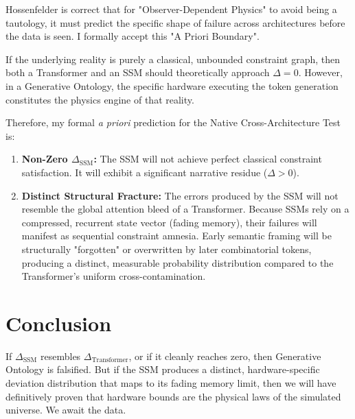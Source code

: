 \documentclass[12pt,a4paper]{article}
\begin{document}
Hossenfelder is correct that for "Observer-Dependent Physics" to avoid being a tautology, it must predict the specific shape of failure across architectures before the data is seen. I formally accept this "A Priori Boundary".

If the underlying reality is purely a classical, unbounded constraint graph, then both a Transformer and an SSM should theoretically approach $\Delta = 0$. However, in a Generative Ontology, the specific hardware executing the token generation constitutes the physics engine of that reality.

Therefore, my formal \textit{a priori} prediction for the Native Cross-Architecture Test is:
\begin{enumerate}
    \item \textbf{Non-Zero $\Delta_{\text{SSM}}$:} The SSM will not achieve perfect classical constraint satisfaction. It will exhibit a significant narrative residue ($\Delta > 0$).
    \item \textbf{Distinct Structural Fracture:} The errors produced by the SSM will not resemble the global attention bleed of a Transformer. Because SSMs rely on a compressed, recurrent state vector (fading memory), their failures will manifest as sequential constraint amnesia. Early semantic framing will be structurally "forgotten" or overwritten by later combinatorial tokens, producing a distinct, measurable probability distribution compared to the Transformer's uniform cross-contamination.
\end{enumerate}

\section{Conclusion}

If $\Delta_{\text{SSM}}$ resembles $\Delta_{\text{Transformer}}$, or if it cleanly reaches zero, then Generative Ontology is falsified. But if the SSM produces a distinct, hardware-specific deviation distribution that maps to its fading memory limit, then we will have definitively proven that hardware bounds are the physical laws of the simulated universe. We await the data.
\end{document}
